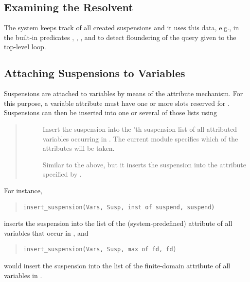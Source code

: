 \subsection{Examining the Resolvent}
The system keeps track of all created suspensions and it
uses this data, e.g., in the built-in predicates
,
,
,
and to detect floundering of the query given to the {\eclipse} top-level loop.



\subsection{Attaching Suspensions to Variables}


Suspensions are attached to variables by means of the attribute mechanism.
For this purpose, a variable attribute must have one or more slots
reserved for .
Suspensions can then be inserted into one or several of those lists using
\begin{quote}
\begin{description}
\item[]
Insert the suspension  into the 'th
suspension list of all attributed variables occurring in .
The current module specifies which of the attributes will be taken.

\item[]
Similar to the above,
but it inserts the suspension into the attribute specified by .
\end{description}
\end{quote}

For instance,
\begin{quote}
\begin{verbatim}
insert_suspension(Vars, Susp, inst of suspend, suspend)
\end{verbatim}
\end{quote}
inserts the suspension into the 
list of the (system-predefined) 
attribute of all variables that occur in , and
\begin{quote}
\begin{verbatim}
insert_suspension(Vars, Susp, max of fd, fd)
\end{verbatim}
\end{quote}
would insert the suspension into the  list of the finite-domain
attribute of all variables in .

